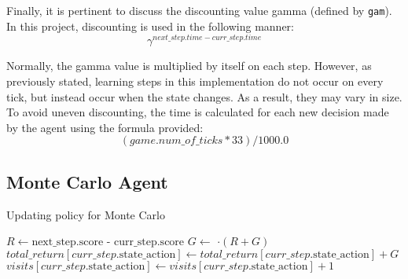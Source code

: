 Finally, it is pertinent to discuss the discounting value gamma (defined by \texttt{gam}). In this project, discounting is used in the following manner: $$\gamma^{next\_step.time - curr\_step.time}$$

Normally, the gamma value is multiplied by itself on each step. However, as previously stated, learning steps in this implementation do not occur on every tick, but instead occur when the state changes. As a result, they may vary in size. To avoid uneven discounting, the time is calculated for each new decision made by the agent using the formula provided:  $$(game.num\_of\_ticks * 33) / 1000.0$$

\subsection{Monte Carlo Agent}

\begin{algorithm}
\caption{Updating policy for Monte Carlo}\label{mcUpdate}
\begin{algorithmic}[1]
\State $R \gets \text{next\_step.score - curr\_step.score}$
\State $G \gets $ $\cdot (R + G)$
\State $total\_return[curr\_step.\text{state\_action}] \gets total\_return[curr\_step.\text{state\_action}] + G$
\State $visits[curr\_step.\text{state\_action}] \gets visits[curr\_step.\text{state\_action}] + 1$
\EndIf
\end{algorithmic}
\end{algorithm}

